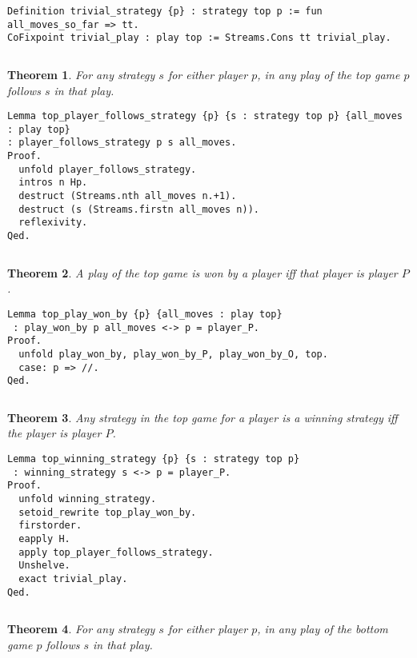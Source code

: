 \documentclass{article}
\newtheorem{thm}{Theorem}
\theoremstyle{definition}
\begin{document}
\begin{verbatim}
Definition trivial_strategy {p} : strategy top p := fun all_moves_so_far => tt.
CoFixpoint trivial_play : play top := Streams.Cons tt trivial_play.
\end{verbatim}

$\left.\right.$

\begin{thm}
For any strategy $s$ for either player $p$, in any play of the top game $p$ follows $s$ in that play. 
\end{thm}

\begin{verbatim}
Lemma top_player_follows_strategy {p} {s : strategy top p} {all_moves : play top} 
: player_follows_strategy p s all_moves.
Proof.
  unfold player_follows_strategy.
  intros n Hp.
  destruct (Streams.nth all_moves n.+1).
  destruct (s (Streams.firstn all_moves n)).
  reflexivity.
Qed.
\end{verbatim}

$\left.\right.$

\begin{thm}
A play of the top game is won by a player iff that player is player $P$. 
\end{thm}

\begin{verbatim}
Lemma top_play_won_by {p} {all_moves : play top}
 : play_won_by p all_moves <-> p = player_P.
Proof.
  unfold play_won_by, play_won_by_P, play_won_by_O, top.
  case: p => //.
Qed.
\end{verbatim}

$\left.\right.$

\begin{thm}
Any strategy in the top game for a player is a winning strategy iff the player is player $P$. 
\end{thm}

\begin{verbatim}
Lemma top_winning_strategy {p} {s : strategy top p}
 : winning_strategy s <-> p = player_P.
Proof.
  unfold winning_strategy.
  setoid_rewrite top_play_won_by.
  firstorder.
  eapply H.
  apply top_player_follows_strategy.
  Unshelve.
  exact trivial_play.
Qed. 
\end{verbatim}

$\left.\right.$

\begin{thm}
For any strategy $s$ for either player $p$, in any play of the bottom game $p$ follows $s$ in that play.
\end{thm}
\end{document}
